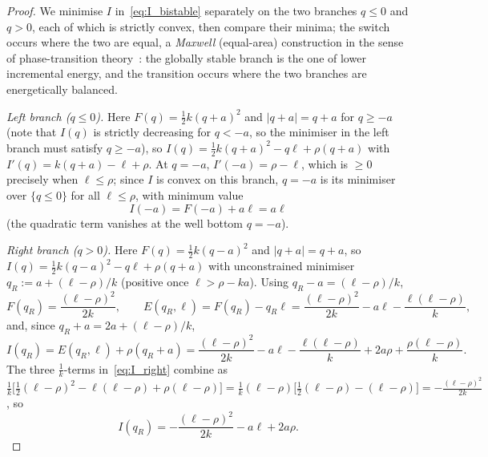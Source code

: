 \begin{proof}
We minimise $I$ in~\eqref{eq:I_bistable} separately on the two branches
$q\le0$ and $q>0$, each of which is strictly convex, then compare their
minima; the switch occurs where the two are equal, a \emph{Maxwell}
(equal-area) construction in the sense of phase-transition
theory~\cite{mielke2002}: the globally stable branch is the one of lower
incremental energy, and the transition occurs where the two branches
are energetically balanced.

\emph{Left branch ($q\le0$).} Here $F(q)=\tfrac12k(q+a)^2$ and
$|q+a|=q+a$ for $q \ge -a$ (note that $I(q)$ is strictly decreasing for $q < -a$, so the minimiser in the left branch must satisfy $q \ge -a$), so
$I(q)=\tfrac12k(q+a)^2-q\ell+\rho(q+a)$ with
$I'(q)=k(q+a)-\ell+\rho$. At $q=-a$, $I'(-a)=\rho-\ell$, which is
$\ge0$ precisely when $\ell\le\rho$; since $I$ is convex on this branch,
$q=-a$ is its minimiser over $\{q\le0\}$ for all $\ell\le\rho$, with
minimum value
\begin{equation}\label{eq:I_left}
  I(-a)=F(-a)+a\ell=a\ell
\end{equation}
(the quadratic term vanishes at the well bottom $q=-a$).

\emph{Right branch ($q>0$).} Here $F(q)=\tfrac12k(q-a)^2$ and
$|q+a|=q+a$, so $I(q)=\tfrac12k(q-a)^2-q\ell+\rho(q+a)$ with unconstrained
minimiser $q_R:=a+(\ell-\rho)/k$ (positive once $\ell>\rho-ka$). Using
$q_R-a=(\ell-\rho)/k$,
\[
  F(q_R)=\frac{(\ell-\rho)^2}{2k},\qquad
  E(q_R,\ell)=F(q_R)-q_R\ell
  =\frac{(\ell-\rho)^2}{2k}-a\ell-\frac{\ell(\ell-\rho)}{k},
\]
and, since $q_R+a=2a+(\ell-\rho)/k$,
\begin{equation}\label{eq:I_right}
  I(q_R)=E(q_R,\ell)+\rho(q_R+a)
  =\frac{(\ell-\rho)^2}{2k}-a\ell-\frac{\ell(\ell-\rho)}{k}+2a\rho+\frac{\rho(\ell-\rho)}{k}.
\end{equation}
The three $\tfrac1k$-terms in~\eqref{eq:I_right} combine as
$\tfrac1k\bigl[\tfrac12(\ell-\rho)^2-\ell(\ell-\rho)+\rho(\ell-\rho)\bigr]
=\tfrac1k(\ell-\rho)\bigl[\tfrac12(\ell-\rho)-(\ell-\rho)\bigr]
=-\tfrac{(\ell-\rho)^2}{2k}$, so
\begin{equation}\label{eq:I_right_simplified}
  I(q_R)=-\frac{(\ell-\rho)^2}{2k}-a\ell+2a\rho .
\end{equation}


\end{proof}
